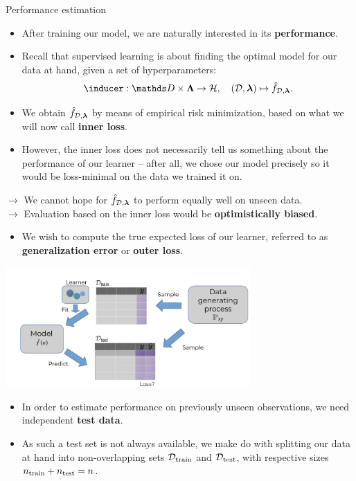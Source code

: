 \begin{vbframe}{Performance estimation}

\begin{itemize}
  \item After training our model, we are naturally interested in its
  \textbf{performance}.
  \item Recall that supervised learning is about finding the optimal model 
  for our data at hand, given a set of hyperparameters: 
  $$\inducer: \preimageInducerShort \rightarrow \Hspace, \quad (\D, \lamv)
  \mapsto \fhDlam.$$
  \item We obtain $\hat{f}_{\mathcal{D}, \bm{\lambda}}$ by means of empirical risk minimization, 
  based on what we will now call \textbf{inner loss}.
  \item However, the inner loss does not necessarily tell us something about the performance 
  of our learner -- after all, we chose our model precisely so it would be 
  loss-minimal on the data we trained it on.
\end{itemize}

\lz
$\rightarrow$ We cannot hope for $\hat{f}_{\mathcal{D}, \bm{\lambda}}$ to perform equally well 
on unseen data. \\
$\rightarrow$ Evaluation based on the inner loss would be 
\textbf{optimistically biased}.

\framebreak

\begin{itemize}
  \item We wish to compute the true expected loss of our learner, referred to as
  \textbf{generalization error} or \textbf{outer loss}.
\end{itemize}

\begin{center}
\includegraphics[trim = 0 0 0 30, clip, width=0.7\textwidth]
{figure_man/evaluation-intro-ge.pdf}
\end{center}

\begin{itemize}
  \item In order to estimate performance on previously unseen observations, we 
  need independent \textbf{test data}. 
  \item As such a test set is not always available, we make do with 
  splitting our data at hand into non-overlapping sets $\mathcal{D}_{\text{train}}$ and $\mathcal{D}_{\text{test}}$, 
  with respective sizes $n_{\mathrm{train}} + n_{\mathrm{test}} = n$.
\end{itemize}

\end{vbframe}


